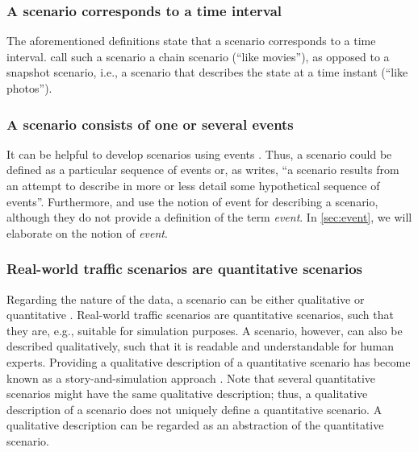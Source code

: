\subsubsection{A scenario corresponds to a time interval}
The aforementioned definitions \cite{go2004blind, geyer2014, ulbrich2015, elrofai2016scenario} state that a scenario corresponds to a time interval. \textcite{vannotten2003updated} call such a scenario a chain scenario (``like movies''), as opposed to a snapshot scenario, i.e., a scenario that describes the state at a time instant (``like photos''). %

\subsubsection{A scenario consists of one or several events \cite{vannotten2003updated, go2004blind, geyer2014, ulbrich2015, kahn1962, englund2016grand, schoemaker1993multiple, cuppens2002alert, bach2016modelbased}}
It can be helpful to develop scenarios using events \cite{bishop2007scentechniques}. Thus, a scenario could be defined as a particular sequence of events or, as \textcite[p.~143]{kahn1962} writes, ``a scenario results from an attempt to describe in more or less detail some hypothetical sequence of events''. Furthermore, \textcite{geyer2014} and \textcite{ulbrich2015} use the notion of event for describing a scenario, although they do not provide a definition of the term \emph{event}. In \cref{sec:event}, we will elaborate on the notion of \emph{event}.

\subsubsection{Real-world traffic scenarios are quantitative scenarios}
Regarding the nature of the data, a scenario can be either qualitative or quantitative \cite{vannotten2003updated}. Real-world traffic scenarios are quantitative scenarios, such that they are, e.g., suitable for simulation purposes. A scenario, however, can also be described qualitatively, such that it is readable and understandable for human experts. Providing a qualitative description of a quantitative scenario has become known as a story-and-simulation approach \cite{alcamo2001scenarios}. Note that several quantitative scenarios might have the same qualitative description; thus, a qualitative description of a scenario does not uniquely define a quantitative scenario. A qualitative description can be regarded as an abstraction of the quantitative scenario.

